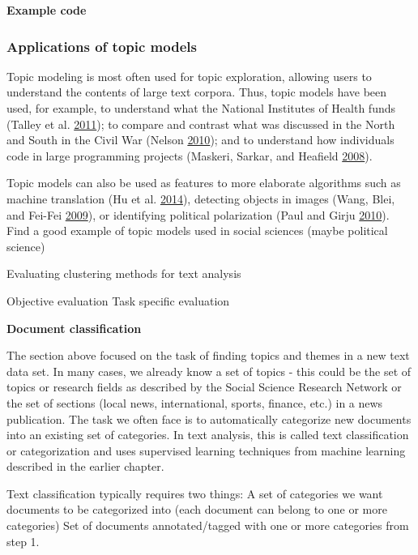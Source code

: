 \documentclass[]{krantz}
\begin{document}
\textbf{Example code}

\subsubsection{Applications of topic
models}\label{applications-of-topic-models}

Topic modeling is most often used for topic exploration, allowing users
to understand the contents of large text corpora. Thus, topic models
have been used, for example, to understand what the National Institutes
of Health funds (Talley et al.
\protect\hyperlink{ref-talley2011database}{2011}); to compare and
contrast what was discussed in the North and South in the Civil War
(Nelson \protect\hyperlink{ref-nelson-10}{2010}); and to understand how
individuals code in large programming projects (Maskeri, Sarkar, and
Heafield \protect\hyperlink{ref-maskeri-08}{2008}).

Topic models can also be used as features to more elaborate algorithms
such as machine translation (Hu et al.
\protect\hyperlink{ref-Hu:Zhai:Eidelman:Boyd-Graber-2014}{2014}),
detecting objects in images (Wang, Blei, and Fei-Fei
\protect\hyperlink{ref-wang-09b}{2009}), or identifying political
polarization (Paul and Girju \protect\hyperlink{ref-paul-10}{2010}).
Find a good example of topic models used in social sciences (maybe
political science)

Evaluating clustering methods for text analysis

Objective evaluation Task specific evaluation

\textbf{Document classification}

The section above focused on the task of finding topics and themes in a
new text data set. In many cases, we already know a set of topics - this
could be the set of topics or research fields as described by the Social
Science Research Network or the set of sections (local news,
international, sports, finance, etc.) in a news publication. The task we
often face is to automatically categorize new documents into an existing
set of categories. In text analysis, this is called text classification
or categorization and uses supervised learning techniques from machine
learning described in the earlier chapter.

Text classification typically requires two things: A set of categories
we want documents to be categorized into (each document can belong to
one or more categories) Set of documents annotated/tagged with one or
more categories from step 1.
\end{document}
